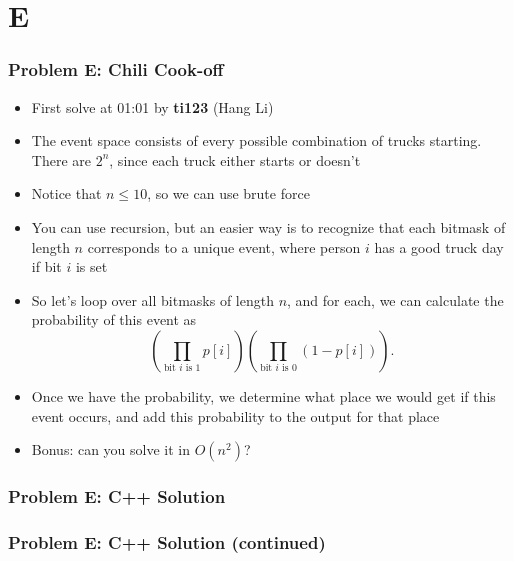 \section{E}%
\label{sec:e}

\begin{frame}
  \frametitle{Problem E: Chili Cook-off}
  \begin{itemize}
    \item First solve at 01:01 by \textbf{ti123} (Hang Li)
    \item The event space consists of every possible combination of trucks starting. There are $2^n$, since each truck either starts or doesn't
    \item Notice that $n \le 10$, so we can use brute force
    \item You can use recursion, but an easier way is to recognize that each bitmask of length $n$
      corresponds to a unique event, where person $i$ has a good truck day if bit $i$ is set
  \end{itemize}
\end{frame}
\begin{frame}
  \begin{itemize}
    \item So let's loop over all bitmasks of length $n$, and for each, we can calculate the probability of this event as \[ \left( \prod_{\text{bit $i$ is 1}} p[i] \right) \left( \prod_{\text{bit $i$ is 0}} (1-p[i]) \right). \]
    \item Once we have the probability, we determine what place we would get if this event occurs, and add this probability to the output for that place
    \item Bonus: can you solve it in $O(n^2)$?
  \end{itemize}
\end{frame}

\begin{frame}
  \frametitle{Problem E: C++ Solution}
\end{frame}
\begin{frame}
  \frametitle{Problem E: C++ Solution (continued)}
\end{frame}
